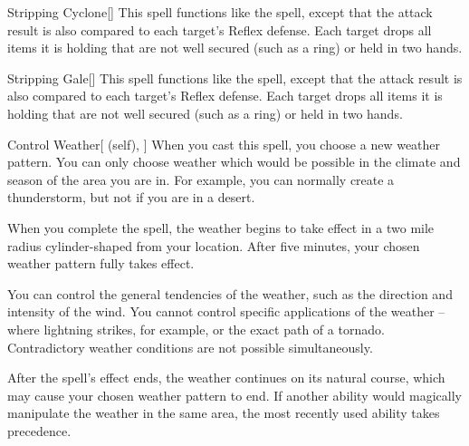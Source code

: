 \lowercase{\hypertarget{spell:Stripping Cyclone}{}}\label{spell:Stripping Cyclone}
\begin{freeability}[\nth{3}]{\hypertarget{spell:Stripping Cyclone}{Stripping Cyclone}}[]
This spell functions like the  spell, except that the attack result is also compared to each target's Reflex defense.
\hit Each target drops all items it is holding that are not well secured (such as a ring) or held in two hands.
\end{freeability}
\vspace{0.25em}



\lowercase{\hypertarget{spell:Stripping Gale}{}}\label{spell:Stripping Gale}
\begin{freeability}[\nth{3}]{\hypertarget{spell:Stripping Gale}{Stripping Gale}}[]
This spell functions like the  spell, except that the attack result is also compared to each target's Reflex defense.
\hit Each target drops all items it is holding that are not well secured (such as a ring) or held in two hands.
\end{freeability}
\vspace{0.25em}



\lowercase{\hypertarget{spell:Control Weather}{}}\label{spell:Control Weather}
\begin{attuneability}[\nth{4}]{\hypertarget{spell:Control Weather}{Control Weather}}[ (self), ]
\targetrule
When you cast this spell, you choose a new weather pattern.
You can only choose weather which would be possible in the climate and season of the area you are in.
For example, you can normally create a thunderstorm, but not if you are in a desert.

When you complete the spell, the weather begins to take effect in a two mile radius cylinder-shaped  from your location.
After five minutes, your chosen weather pattern fully takes effect.

You can control the general tendencies of the weather, such as the direction and intensity of the wind.
You cannot control specific applications of the weather -- where lightning strikes, for example, or the exact path of a tornado.
Contradictory weather conditions are not possible simultaneously.

After the spell's effect ends, the weather continues on its natural course, which may cause your chosen weather pattern to end.
If another ability would magically manipulate the weather in the same area, the most recently used ability takes precedence.
\end{attuneability}
\vspace{0.25em}



